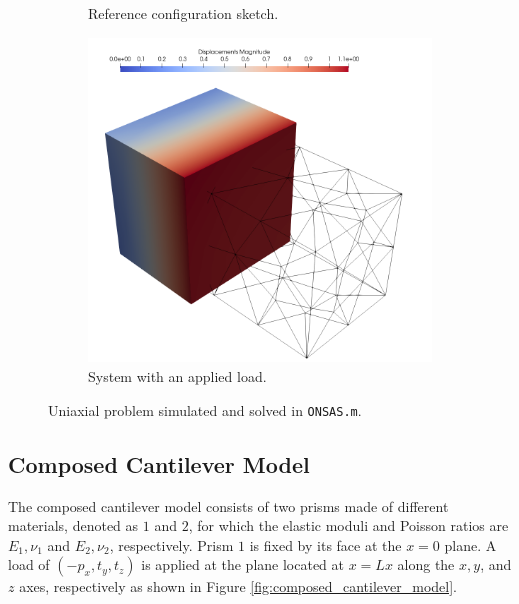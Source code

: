 \documentclass[oneside,a4paper,english,links]{amca}
\begin{document}
\begin{figure}[ht]
	\centering
	\begin{subfigure}[b]{0.48\textwidth}
	\def\svgwidth{\textwidth}
	
	\caption{Reference configuration sketch.}
	\end{subfigure}
	\hfill
	\begin{subfigure}[b]{0.48\textwidth}
	\centering
		\includegraphics[width=\textwidth]{Figures/Example1.png}
	\caption{System with an applied load.}
	\end{subfigure}
	\caption{Uniaxial problem simulated and solved in \texttt{ONSAS.m}.}
	\label{fig:uniaxial_model}
\end{figure}


\subsection{Composed Cantilever Model}
The composed cantilever model consists of two prisms made of different materials, denoted as $1$ and $2$, for which the elastic moduli and Poisson ratios are $E_1, \nu_1$ and $E_2, \nu_2$, respectively. Prism $1$ is fixed by its face at the $x=0$ plane. A load of $(-p_x, t_y, t_z)$ is applied at the plane located at $x=Lx$ along the $x, y$, and $z$ axes, respectively as shown in Figure \ref{fig:composed_cantilever_model}.
\end{document}
